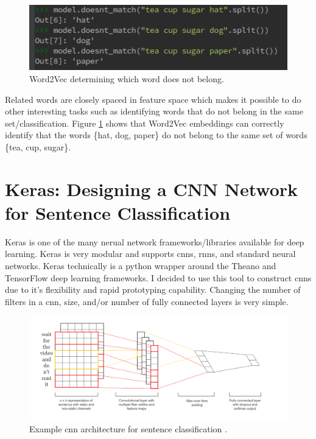 \documentclass[12pt]{article}
\begin{document}
\begin{figure}[htbp!]
	\centering
	\includegraphics[scale=.5]{tea_cup.png}
	\caption{Word2Vec determining which word does not belong.}
	\label{fig:tea_cup}
\end{figure}

Related words are closely spaced in feature space which makes it possible to do other interesting tasks such as identifying words that do not belong in the same set/classification. Figure \ref{fig:tea_cup} shows that Word2Vec embeddings can correctly identify that the words \{hat, dog, paper\} do not belong to the same set of words \{tea, cup, sugar\}.


\section {Keras: Designing a CNN Network for Sentence Classification}
Keras \cite{chollet2015keras} is one of the many nerual network frameworks/libraries available for deep learning. Keras is very modular and supports \ac{cnn}s, \ac{rnn}s, and standard neural networks. Keras technically is a python wrapper around the Theano and TensorFlow deep learning frameworks. I decided to use this tool to construct \ac{cnn}s due to it's flexibility and rapid prototyping capability. Changing the number of filters in a \ac{cnn}, size, and\slash or number of fully connected layers is very simple. 

\begin{figure}[htbp!]
	\centering
	\includegraphics[scale=.4]{network_structure.png}
	\caption{Example \ac{cnn} architecture for sentence classification \cite{kim2014convolutional}.}
	\label{fig:network_structure}
\end{figure}
\end{document}
